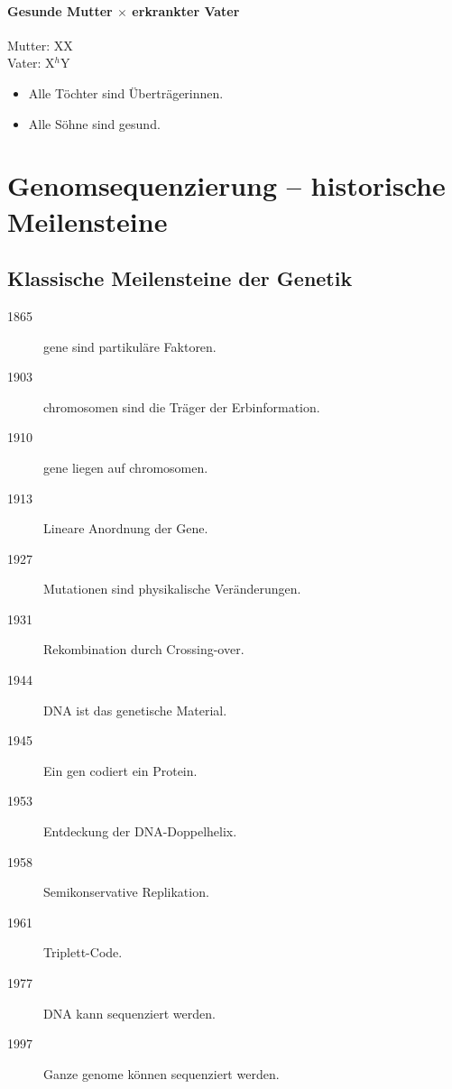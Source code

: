 \paragraph{Gesunde Mutter $\times$ erkrankter Vater}

Mutter: XX \\
Vater: X$^{h}$Y

\begin{itemize}
    \item Alle Töchter sind Überträgerinnen.
    \item Alle Söhne sind gesund.
\end{itemize}





\section{Genomsequenzierung -- historische Meilensteine}\label{sec:genomsequenzierung----historische-meilensteine}

\subsection*{Klassische Meilensteine der Genetik}\label{subsec:klassische-meilensteine-der-genetik}

\begin{description}
    \item[1865] \gls{gen}e sind partikuläre Faktoren.
    \item[1903] \gls{chromosom}en sind die Träger der Erbinformation.
    \item[1910] \gls{gen}e liegen auf \gls{chromosom}en.
    \item[1913] Lineare Anordnung der Gene.
    \item[1927] Mutationen sind physikalische Veränderungen.
    \item[1931] Rekombination durch Crossing-over.
    \item[1944] DNA ist das genetische Material.
    \item[1945] Ein \gls{gen} codiert ein Protein.
    \item[1953] Entdeckung der DNA-Doppelhelix.
    \item[1958] Semikonservative Replikation.
    \item[1961] Triplett-Code.
    \item[1977] DNA kann sequenziert werden.
    \item[1997] Ganze \gls{genom}e können sequenziert werden.
\end{description}

